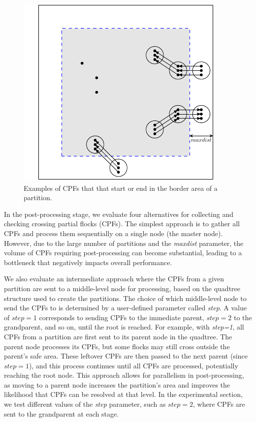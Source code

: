 \begin{figure}
    \centering
    \includegraphics[width=0.7\linewidth]{chapterPFlocks/figures/maxdist.pdf}
    \caption{Examples of CPFs that that start or end in the border area of a partition.}\label{fig:maxdist}
\end{figure}



In the post-processing stage, we evaluate four alternatives for collecting and checking crossing partial flocks (CPFs). The simplest approach is to gather all 
CPFs and process them sequentially on a single node (the master node). However, due to the large number of partitions and the \textit{maxdist} parameter, the 
volume of CPFs requiring post-processing can become substantial, leading to a bottleneck that negatively impacts overall performance.

We also evaluate an intermediate approach where the CPFs from a given partition are sent to a middle-level node for processing, based on the quadtree structure 
used to create the partitions. The choice of which middle-level node to send the CPFs to is determined by a user-defined parameter called \textit{step}. A value 
of $step = 1$ corresponds to sending CPFs to the immediate parent, $step = 2$ to the grandparent, and so on, until the root is reached. For example, with 
\textit{step=1}, all CPFs from a partition are first sent to its parent node in the quadtree. The parent node processes its CPFs, but some flocks may still 
cross outside the parent's safe area.  These leftover CPFs are then passed to the next parent (since $step = 1$), and this process continues until all CPFs are 
processed, potentially reaching the root node. This approach allows for parallelism in post-processing, as moving to a parent node increases the partition's 
area and improves the likelihood that CPFs can be resolved at that level. In the experimental section, we test different values of the \textit{step} parameter, 
such as $step=2$, where CPFs are sent to the grandparent at each stage.

